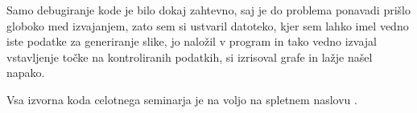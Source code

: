 \documentclass{egpubl}
\begin{document}
	Samo debugiranje kode je bilo dokaj zahtevno, saj je do problema ponavadi prišlo globoko med izvajanjem, zato sem si ustvaril datoteko, kjer sem lahko imel vedno iste podatke za generiranje slike, jo naložil v program in tako vedno izvajal vstavljenje točke na kontroliranih podatkih, si izrisoval grafe in lažje našel napako.
	
	Vsa izvorna koda celotnega seminarja je na voljo na spletnem naslovu \cite{source_code}.
	
	
	
	
\end{document}
